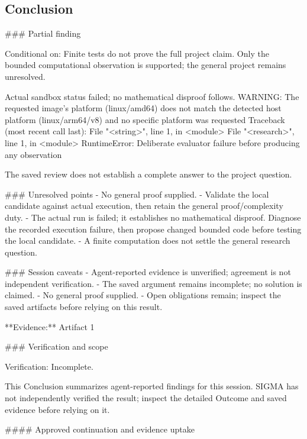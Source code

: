 \documentclass[11pt]{article}
\begin{document}
\subsection{Conclusion}
\#\#\# Partial finding

Conditional on: Finite tests do not prove the full project claim. Only the bounded computational observation is supported; the general project remains unresolved.

Actual sandbox status failed; no mathematical disproof follows. WARNING: The requested image's platform (linux/amd64) does not match the detected host platform (linux/arm64/v8) and no specific platform was requested
Traceback (most recent call last):
  File "\textless{}string\textgreater{}", line 1, in \textless{}module\textgreater{}
  File "\textless{}research\textgreater{}", line 1, in \textless{}module\textgreater{}
RuntimeError: Deliberate evaluator failure before producing any observation

The saved review does not establish a complete answer to the project question.

\#\#\# Unresolved points
- No general proof supplied.
- Validate the local candidate against actual execution, then retain the general proof/complexity duty.
- The actual run is failed; it establishes no mathematical disproof. Diagnose the recorded execution failure, then propose changed bounded code before testing the local candidate.
- A finite computation does not settle the general research question.

\#\#\# Session caveats
- Agent-reported evidence is unverified; agreement is not independent verification.
- The saved argument remains incomplete; no solution is claimed.
- No general proof supplied.
- Open obligations remain; inspect the saved artifacts before relying on this result.

**Evidence:** Artifact 1

\#\#\# Verification and scope

Verification: Incomplete.

This Conclusion summarizes agent-reported findings for this session. SIGMA has not independently verified the result; inspect the detailed Outcome and saved evidence before relying on it.

\#\#\#\# Approved continuation and evidence uptake
\end{document}
